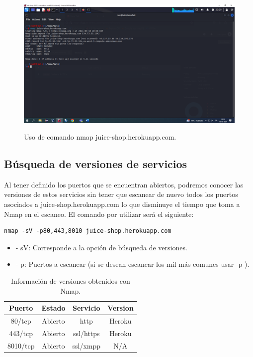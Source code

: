 \documentclass[stu, 11pt, letterpaper, donotrepeattitle, floatsintext, natbib]{apa7}
\begin{document}
\begin{figure}[H]
    \centering
    \caption{Uso de comando nmap juice-shop.herokuapp.com.}
    \includegraphics[width=0.75\linewidth]{Imagen1.png} %
    \label{fig:OverallEffect}
\end{figure}


\subsection{Búsqueda de versiones de servicios} 
Al tener definido los puertos que se encuentran abiertos, podremos conocer las versiones de estos servicios sin tener que escanear de nuevo todos los puertos asociados a juice-shop.herokuapp.com lo que disminuye el tiempo que toma a Nmap en el escaneo. El comando por utilizar será el siguiente:
\newline

\begin{lstlisting}
nmap -sV -p80,443,8010 juice-shop.herokuapp.com
\end{lstlisting}

\begin{itemize}
  \item[] - sV: Corresponde a la opción de búsqueda de versiones.
  \item[] - p: Puertos a escanear (si se desean escanear los mil más comunes usar -p-).
\end{itemize}


\begin{table}[H]
    \caption{Información de versiones obtenidos con Nmap.}
    \centering
    \begin{tabular}{cccc} %
        \hline 
         Puerto & Estado & Servicio & Version\\
         \hline
         80/tcp & Abierto & http & Heroku\\
          443/tcp & Abierto & ssl/https & Heroku\\
	8010/tcp & Abierto & ssl/xmpp & N/A\\
         \hline
    \end{tabular}
    \label{tab:table_words}
\end{table}
\end{document}
